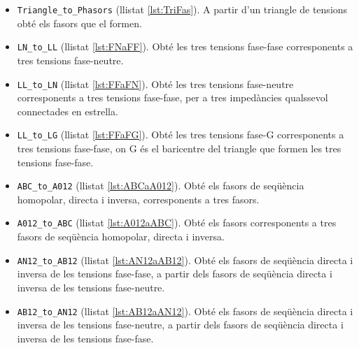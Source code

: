 \begin{itemize}
   \item \texttt{Triangle\_to\_Phasors} (llistat \vref{lst:TriFas}). A partir d'un triangle de tensions obté els fasors que el formen.
   \item \texttt{LN\_to\_LL} (llistat \vref{lst:FNaFF}). Obté les tres tensions fase-fase corresponents a tres tensions fase-neutre.
   \item \texttt{LL\_to\_LN} (llistat \vref{lst:FFaFN}). Obté les tres tensions fase-neutre corresponents a tres tensions fase-fase, per a tres impedàncies qualssevol connectades en estrella.
   \item \texttt{LL\_to\_LG} (llistat \vref{lst:FFaFG}). Obté les tres tensions fase-G corresponents a tres tensions fase-fase, on G és el baricentre del triangle que formen les tres tensions fase-fase.
   \item \texttt{ABC\_to\_A012} (llistat \vref{lst:ABCaA012}). Obté els fasors de seqüència homopolar, directa i inversa, corresponents a tres fasors.
   \item \texttt{A012\_to\_ABC} (llistat \vref{lst:A012aABC}). Obté els  fasors corresponents a tres fasors de seqüència homopolar, directa i inversa.
   \item \texttt{AN12\_to\_AB12} (llistat \vref{lst:AN12aAB12}). Obté els fasors de seqüència directa i inversa de les tensions fase-fase, a partir dels fasors de seqüència directa i inversa de les tensions fase-neutre.
   \item \texttt{AB12\_to\_AN12} (llistat \vref{lst:AB12aAN12}). Obté els fasors de seqüència directa i inversa de les tensions fase-neutre, a partir dels fasors de seqüència directa i inversa de les tensions fase-fase.
\end{itemize}

